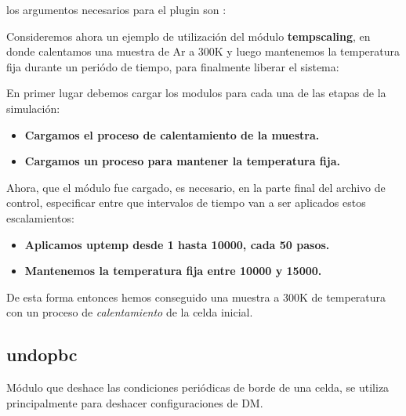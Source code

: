 los argumentos necesarios para el plugin son :


Consideremos ahora un ejemplo de utilizaci\'on del m\'odulo
\textbf{tempscaling}, en donde calentamos una muestra de Ar a 300K y luego
mantenemos la temperatura fija durante un peri\'odo de tiempo, para finalmente
liberar el sistema:

En primer lugar debemos cargar los modulos para cada una de las etapas de la
simulaci\'on:

\begin{itemize}
 \item \textbf{Cargamos el proceso de calentamiento de la muestra.}
 \item \textbf{Cargamos un proceso para mantener la temperatura fija.}
\end{itemize}

Ahora, que el m\'odulo fue cargado, es necesario, en la parte final del archivo
de control, especificar entre que intervalos de tiempo van a ser aplicados estos
escalamientos:

\begin{itemize}
 \item \textbf{Aplicamos \textbf{uptemp} desde 1 hasta 10000, cada 50 pasos.}
 \item \textbf{Mantenemos la temperatura fija entre 10000 y 15000.}
\end{itemize}

De esta forma entonces hemos conseguido una muestra a 300K de temperatura con un
proceso de \textit{calentamiento} de la celda inicial.

\subsection{undopbc}
M\'odulo que deshace las condiciones peri\'odicas de borde de una celda, se
utiliza principalmente para deshacer configuraciones de DM.

